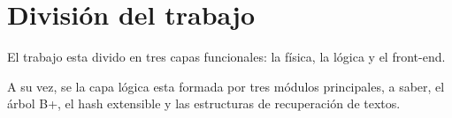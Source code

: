 \documentclass{article}
\begin{document}
\section{División del trabajo}

	El trabajo esta divido en tres capas funcionales: la física, la lógica y el front-end.
	\par
	A su vez, se la capa lógica esta formada por tres módulos principales, a saber, el árbol B+, el hash extensible y las estructuras de recuperación de textos.
\end{document}
